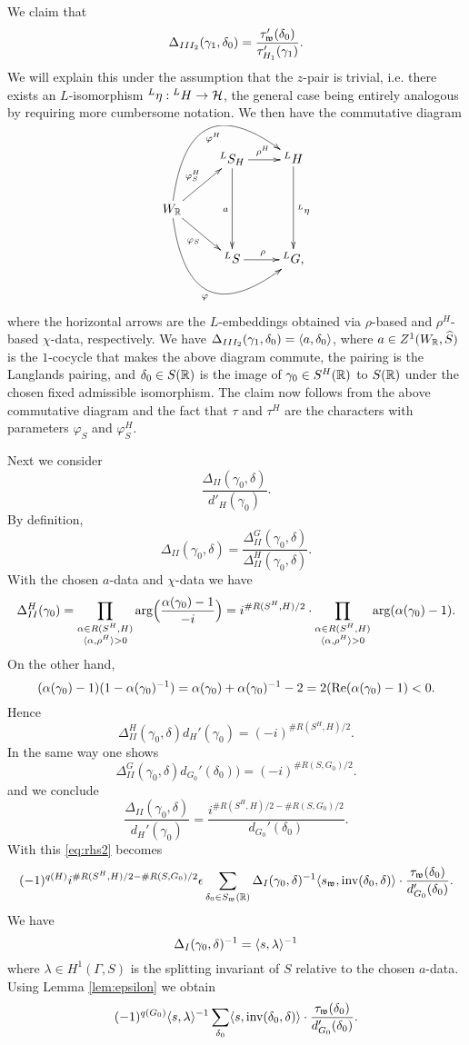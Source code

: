 \documentclass{article}
\theoremstyle{definition}
\numberwithin{equation}{section}
\renewcommand{\-}{\hyp{}}
\begin{document}
We claim that
\[ \Delta_{III_2}(\gamma_1,\delta_0) = \frac{\tau'_{\mathfrak{w}}(\delta_0)}{\tau'_{H_1}(\gamma_1)}.\]
We will explain this under the assumption that the $z$-pair is trivial, i.e. there exists an $L$-isomorphism $^L\eta : {^LH} \to \mathcal{H}$, the general case being entirely analogous by requiring more cumbersome notation. We then have the commutative diagram
\[ \xymatrix{
	&^LS_H\ar[dd]_a\ar[r]^{\rho^H}&^LH\ar[dd]^{^L\eta}\\
	W_\R\ar[ru]^{\varphi^H_S}\ar@/^4pc/[rru]_-{\varphi^H}\ar[rd]_{\varphi_S}\ar@/_4pc/[rrd]_-{\varphi}\\
	&^LS\ar[r]^{\rho}&^LG,
}
\]
where the horizontal arrows are the $L$-embeddings obtained via $\rho$-based and $\rho^H$-based $\chi$-data, respectively. We have $\Delta_{III_2}(\gamma_1,\delta_0)=\langle a,\delta_0\rangle$, where $a \in Z^1(W_{\mathbb{R}},\widehat S)$ is the $1$-cocycle that makes the above diagram commute, the pairing is the Langlands pairing, and $\delta_0 \in S(\mathbb{R})$ is the image of $\gamma_0 \in S^H(\mathbb{R})$ to $S(\mathbb{R})$ under the chosen fixed admissible isomorphism. The claim now follows from the above commutative diagram and the fact that $\tau$ and $\tau^H$ are the characters with parameters $\varphi_S$ and $\varphi_S^H$.



Next we consider
\[ \frac{\Delta_{II}(\gamma_0,\delta)}{d'_H(\gamma_0)}.\]
By definition,
\[ \Delta_{II}(\gamma_0,\delta) = \frac{\Delta_{II}^G(\gamma_0,\delta)}{\Delta_{II}^H(\gamma_0,\delta)}.\]
With the chosen $a$-data and $\chi$-data we have
\[ \Delta_{II}^H(\gamma_0)=\prod\limits_{\substack{\alpha \in R(S^H,H)\\ \langle\alpha,\rho^H\rangle>0}}\textrm{arg}\Big(\frac{\alpha(\gamma_0)-1}{-i}\Big) = i^{\#R(S^H,H)/2}\cdot\prod\limits_{\substack{\alpha \in R(S^H,H)\\ \langle\alpha,\rho^H\rangle>0}}\textrm{arg}(\alpha(\gamma_0)-1). \]
On the other hand,
\[ (\alpha(\gamma_0)-1)(1-\alpha(\gamma_0)^{-1})=\alpha(\gamma_0)+\alpha(\gamma_0)^{-1}-2=2(\textrm{Re}(\alpha(\gamma_0)-1) < 0.\]
Hence
\[ \Delta_{II}^H(\gamma_0,\delta)d_H'(\gamma_0) = (-i)^{\#R(S^H,H)/2}. \]
In the same way one shows
\[ \Delta_{II}^G(\gamma_0,\delta)d_{G_0}'(\delta_0)) = (-i)^{\#R(S,G_0)/2}. \]
and we conclude
\[ \frac{\Delta_{II}(\gamma_0,\delta)}{d_H'(\gamma_0)} = \frac{i^{\#R(S^H,H)/2-\#R(S,G_0)/2}}{d_{G_0}'(\delta_0)}.\]
With this \eqref{eq:rhs2} becomes
\[ (-1)^{q(H)}i^{\#R(S^H,H)/2-\#R(S,G_0)/2}\epsilon \sum_{\delta_0 \in S_{\mathfrak{w}}(\mathbb{R})}\Delta_I(\gamma_0,\delta)^{-1} \langle s_{\mathfrak{w}},\textrm{inv}(\delta_0,\delta)\rangle \cdot\frac{\tau_{\mathfrak{w}}(\delta_0)}{d'_{G_0}(\delta_0)}. \]
We have
\[ \Delta_{I}(\gamma_0,\delta)^{-1} = \langle s,\lambda\rangle^{-1} \]
where $\lambda \in H^1(\Gamma,S)$ is the splitting invariant of $S$ relative to the chosen $a$-data. Using Lemma \ref{lem:epsilon} we obtain
\[(-1)^{q(G_0)}\langle s,\lambda\rangle^{-1}\sum_{\delta_0}\langle s,\textrm{inv}(\delta_0,\delta)\rangle\cdot\frac{\tau_{\mathfrak{w}}(\delta_0)}{d_{G_0}'(\delta_0)}. \]
\end{document}
